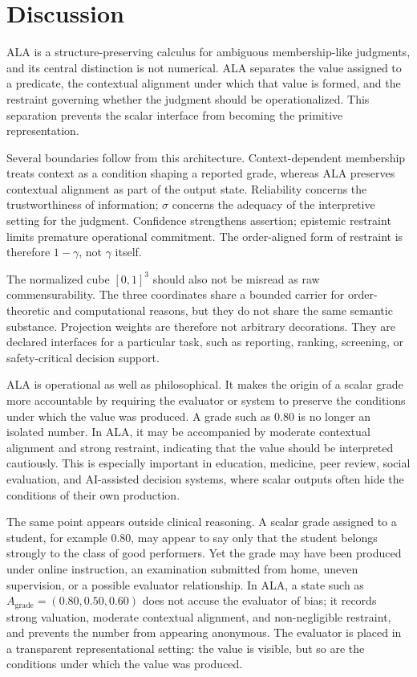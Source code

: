 \documentclass[reqno,final]{amsart}
\theoremstyle{definition}
\theoremstyle{plain}
\theoremstyle{remark}
\begin{document}
\section{Discussion}
\label{sec:discussion}

ALA is a structure-preserving calculus for ambiguous membership-like judgments, and its central distinction is not numerical. ALA separates the value assigned to a predicate, the contextual alignment under which that value is formed, and the restraint governing whether the judgment should be operationalized. This separation prevents the scalar interface from becoming the primitive representation.

Several boundaries follow from this architecture. Context-dependent membership treats context as a condition shaping a reported grade, whereas ALA preserves contextual alignment as part of the output state. Reliability concerns the trustworthiness of information; \(\sigma\) concerns the adequacy of the interpretive setting for the judgment. Confidence strengthens assertion; epistemic restraint limits premature operational commitment. The order-aligned form of restraint is therefore \(1-\gamma\), not \(\gamma\) itself.

The normalized cube \([0,1]^3\) should also not be misread as raw commensurability. The three coordinates share a bounded carrier for order-theoretic and computational reasons, but they do not share the same semantic substance. Projection weights are therefore not arbitrary decorations. They are declared interfaces for a particular task, such as reporting, ranking, screening, or safety-critical decision support.

ALA is operational as well as philosophical. It makes the origin of a scalar grade more accountable by requiring the evaluator or system to preserve the conditions under which the value was produced. A grade such as \(0.80\) is no longer an isolated number. In ALA, it may be accompanied by moderate contextual alignment and strong restraint, indicating that the value should be interpreted cautiously. This is especially important in education, medicine, peer review, social evaluation, and AI-assisted decision systems, where scalar outputs often hide the conditions of their own production.

The same point appears outside clinical reasoning. A scalar grade assigned to a student, for example \(0.80\), may appear to say only that the student belongs strongly to the class of good performers. Yet the grade may have been produced under online instruction, an examination submitted from home, uneven supervision, or a possible evaluator relationship. In ALA, a state such as \(A_{\mathrm{grade}}=(0.80,0.50,0.60)\) does not accuse the evaluator of bias; it records strong valuation, moderate contextual alignment, and non-negligible restraint, and prevents the number from appearing anonymous. The evaluator is placed in a transparent representational setting: the value is visible, but so are the conditions under which the value was produced.
\end{document}
